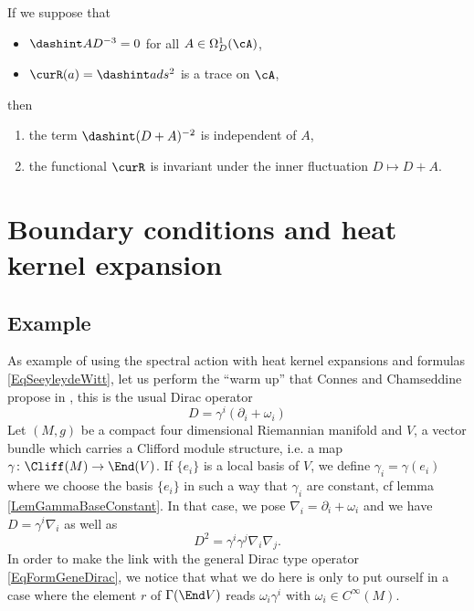 \begin{proposition}
If we suppose that 
\begin{itemize}
\item $\dashint AD^{-3}=0$ for all $A\in\Omega^1_D(\cA)$,
\item $\curR(a)=\dashint ads^2$ is a trace on $\cA$,
\end{itemize}
then 
\begin{enumerate}
\item the term $\dashint (D+A)^{-2}$ is independent of $A$,
\item the functional $\curR$ is invariant under the inner fluctuation $D\mapsto D+A$.
\end{enumerate}
\end{proposition}



\section{Boundary conditions and heat kernel expansion}			\label{SecGravBoundCC}

\subsection{Example}

As example of using the spectral action with heat kernel expansions and formulas \eqref{EqSeeyleydeWitt}, let us perform the ``warm up'' that Connes and Chamseddine propose in \cite{QGBoundaryTermsSpectralAction}, this is the usual Dirac operator
\begin{equation}		\label{EqFormgenDiracD}
D=\gamma^i(\partial_i+\omega_i)
\end{equation}
Let $(M,g)$ be a compact four dimensional Riemannian manifold and $V$, a vector bundle which carries a Clifford module structure, i.e. a map $\gamma\colon \Cliff(M)\to \End(V)$. If $\{ e_i \}$ is a local basis of $V$, we define $\gamma_i=\gamma(e_i)$ where we choose the basis $\{ e_i \}$ in such a way that $\gamma_i$ are constant, cf lemma \ref{LemGammaBaseConstant}. In that case, we pose $\nabla_i=\partial_i+\omega_i$ and we have $D=\gamma^i\nabla_i$ as well as
\[ 
  D^2=\gamma^i\gamma^j\nabla_i\nabla_j.
\]
In order to make the link with the general Dirac type operator \eqref{EqFormGeneDirac}, we notice that what we do here is only to put ourself in a case where the element $r$ of $\Gamma(\End V)$ reads $\omega_i\gamma^i$ with $\omega_i\in C^{\infty}(M)$.


